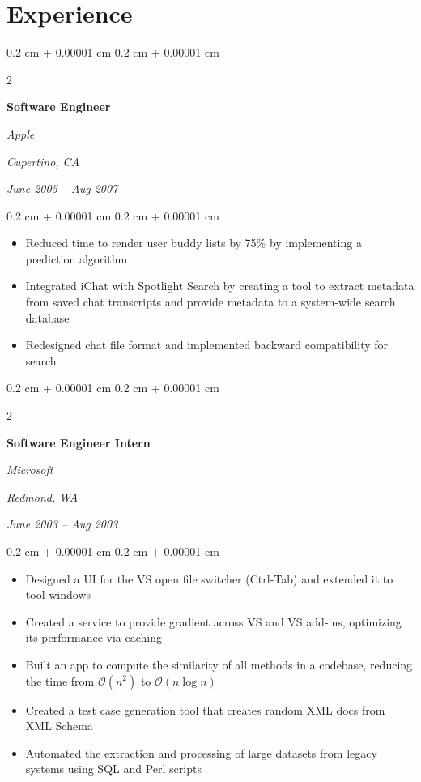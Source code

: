 \documentclass[10pt, letterpaper]{article}
\newenvironment{highlights}{
    \begin{itemize}[
        topsep=0.10 cm,
        parsep=0.10 cm,
        partopsep=0pt,
        itemsep=0pt,
        leftmargin=0.4 cm + 10pt
    ]
}{
    \end{itemize}
} %
\newenvironment{onecolentry}{
    \begin{adjustwidth}{
        0.2 cm + 0.00001 cm
    }{
        0.2 cm + 0.00001 cm
    }
}{
    \end{adjustwidth}
} %
\newenvironment{twocolentry}[2][]{
    \onecolentry
    \def\secondColumn{#2}
    \setcolumnwidth{\fill, 4.5 cm}
    \begin{paracol}{2}
}{
    \switchcolumn \raggedleft \secondColumn
    \end{paracol}
    \endonecolentry
} %
\begin{document}
    
    \section{Experience}



        
        \begin{twocolentry}{
        \textit{Cupertino, CA}    
            
        \textit{June 2005 – Aug 2007}}
            \textbf{Software Engineer}
            
            \textit{Apple}
        \end{twocolentry}

        \vspace{0.10 cm}
        \begin{onecolentry}
            \begin{highlights}
                \item Reduced time to render user buddy lists by 75\% by implementing a prediction algorithm
                \item Integrated iChat with Spotlight Search by creating a tool to extract metadata from saved chat transcripts and provide metadata to a system-wide search database
                \item Redesigned chat file format and implemented backward compatibility for search
            \end{highlights}
        \end{onecolentry}


        \vspace{0.2 cm}

        \begin{twocolentry}{
        \textit{Redmond, WA}    
            
        \textit{June 2003 – Aug 2003}}
            \textbf{Software Engineer Intern}
            
            \textit{Microsoft}
        \end{twocolentry}

        \vspace{0.10 cm}
        \begin{onecolentry}
            \begin{highlights}
                \item Designed a UI for the VS open file switcher (Ctrl-Tab) and extended it to tool windows
                \item Created a service to provide gradient across VS and VS add-ins, optimizing its performance via caching
                \item Built an app to compute the similarity of all methods in a codebase, reducing the time from $\mathcal{O}(n^2)$ to $\mathcal{O}(n \log n)$
                \item Created a test case generation tool that creates random XML docs from XML Schema
                \item Automated the extraction and processing of large datasets from legacy systems using SQL and Perl scripts
            \end{highlights}
        \end{onecolentry}
\end{document}
